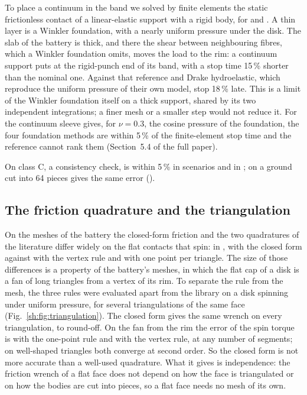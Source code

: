 To place a continuum in the band we solved by finite elements the static frictionless contact
of a linear-elastic support with a rigid body, for  and . A thin layer
is a Winkler foundation, with a nearly uniform pressure under the disk. The slab of the
battery is thick, and there the shear between neighbouring fibres, which a Winkler foundation
omits, moves the load to the rim: a continuum support puts  at the rigid-punch end
of its band, with a stop time 15\,\% shorter than the nominal one. Against that reference
 and Drake hydroelastic, which reproduce the uniform pressure of their own
model, stop 18\,\% late. This is a limit of the Winkler foundation itself on a thick support,
shared by its two independent integrations; a finer mesh or a smaller step would not reduce
it. For  the continuum sleeve gives, for $\nu=0.3$, the cosine pressure of the foundation, the
four foundation methods are within 5\,\% of the finite-element stop time and the reference
cannot rank them (Section~5.4 of the full paper).

On class C, a consistency check,  is within 5\,\% in
 scenarios and  in ; on a
ground cut into 64 pieces  gives the same error
().

\subsection{The friction quadrature and the triangulation}\label{sh:quadrature}

On the meshes of the battery the closed-form friction and the two quadratures of the
literature differ widely on the flat contacts that spin: in ,
 with the closed form against  with the
vertex rule and  with one point per triangle. The size of those differences is a property of the battery's
meshes, in which the flat cap of a disk is a fan of long triangles from a vertex of its rim.
To separate the rule from the mesh, the three rules were evaluated apart from the library on a
disk spinning under uniform pressure, for several triangulations of the same face
(Fig.~\ref{sh:fig:triangulation}). The closed form gives the same wrench on every
triangulation, to round-off. On the fan from the rim the error of the spin torque is
 with the one-point rule and
 with the vertex rule, at any number of segments; on well-shaped
triangles both converge at second order. So the closed form is not more accurate than a
well-used quadrature. What it gives is independence: the
friction wrench of a flat face does not depend on how the face is triangulated or on how the
bodies are cut into pieces, so a flat face needs no mesh of its own.

